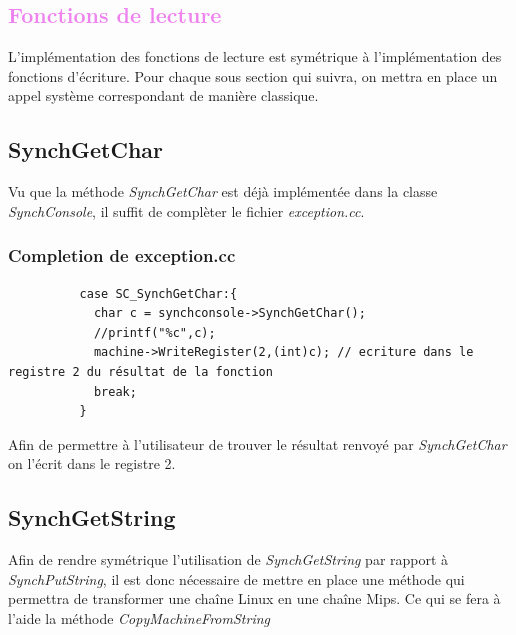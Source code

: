 \documentclass[a4paper,10pt]{report}
\begin{document}
  \textcolor{Violet}{\section{Fonctions de lecture}}
  L'implémentation des fonctions de lecture est symétrique à l'implémentation des fonctions d'écriture. Pour chaque sous section qui suivra, on mettra en place
  un appel système correspondant de manière classique.
  
   \textcolor{NavyBlue}{\subsection{SynchGetChar}}
   Vu que la méthode \emph{SynchGetChar} est déjà implémentée dans la classe \emph{SynchConsole}, il suffit de complèter le fichier \emph{exception.cc}.
   
   \textcolor{TealBlue}{\subsubsection*{Completion de exception.cc}}
   \begin{lstlisting}
          case SC_SynchGetChar:{
            char c = synchconsole->SynchGetChar();
            //printf("%c",c);
            machine->WriteRegister(2,(int)c); // ecriture dans le registre 2 du résultat de la fonction
            break;
          }    
   \end{lstlisting}
    Afin de permettre à l'utilisateur de trouver le résultat renvoyé par \emph{SynchGetChar} on l'écrit dans le registre 2.
    
     \textcolor{NavyBlue}{\subsection{SynchGetString}}
     Afin de rendre symétrique l'utilisation de \emph{SynchGetString} par rapport à \emph{SynchPutString}, il est donc nécessaire de mettre en place une 
     méthode qui permettra de transformer une chaîne Linux en une chaîne Mips. Ce qui se fera à l'aide la méthode \emph{CopyMachineFromString}
     
\end{document}
